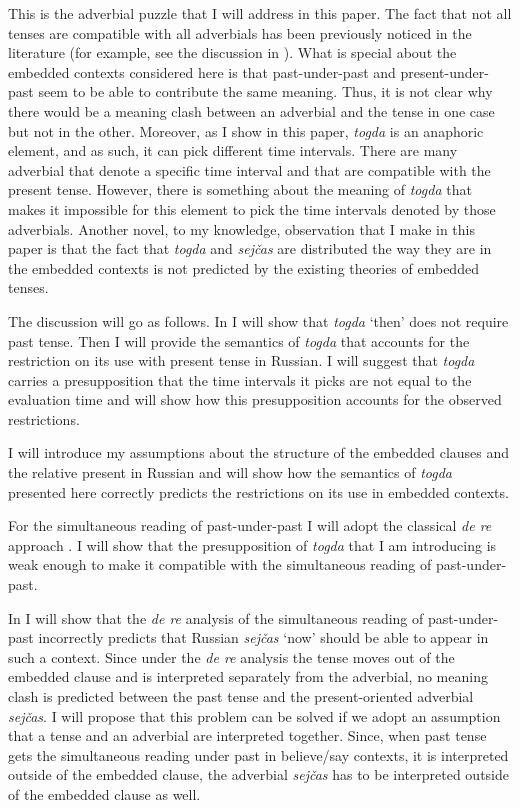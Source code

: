 \documentclass[output=paper,
modfonts,
newtxmath,
hidelinks
]{langscibook}
\begin{document}
\noindent This is the adverbial puzzle that I will address in this paper. The fact that not all tenses are compatible with all adverbials has been previously noticed in the literature (for example, see the discussion in \citealt{Hornstein1990}). What is special about the embedded contexts considered here is that past-under-past and present-under-past seem to be able to contribute the same meaning. Thus, it is not clear why there would be a meaning clash between an adverbial and the tense in one case but not in the other. Moreover, as I show in this paper, \textit{togda} is an anaphoric element, and as such, it can pick different time intervals. There are many adverbial that denote a specific time interval and that are compatible with the present tense. However, there is something about the meaning of \textit{togda} that makes it impossible for this element to pick the time intervals denoted by those adverbials. Another novel, to my knowledge, observation that I make in this paper is that the fact that \textit{togda} and \textit{sejčas} are distributed the way they are in the embedded contexts is not predicted by the existing theories of embedded tenses.

The discussion will go as follows. In  I will show that \textit{togda} ‘then’ does not require past tense. Then I will provide the semantics of \textit{togda} that accounts for the restriction on its use with present tense in Russian. I will suggest that \textit{togda} carries a presupposition that the time intervals it picks are not equal to the evaluation time and will show how this presupposition accounts for the observed restrictions.

I will introduce my assumptions about the structure of the embedded clauses and the relative present in Russian and will show how the semantics of \textit{togda} presented here correctly predicts the restrictions on its use in embedded contexts.

For the simultaneous reading of past-under-past I will adopt the classical \textit{de re} approach \citep{Abusch1997,Heim1994}. I will show that the presupposition of \textit{togda} that I am introducing is weak enough to make it compatible with the simultaneous reading of past-under-past.

In  I will show that the \textit{de re} analysis of the simultaneous reading of past-under-past incorrectly predicts that Russian \textit{sejčas} ‘now’ should be able to appear in such a context. Since under the \textit{de re} analysis the tense moves out of the embedded clause and is interpreted separately from the adverbial, no meaning clash is predicted between the past tense and the present-oriented adverbial \textit{sejčas}. I will propose that this problem can be solved if we adopt an assumption that a tense and an adverbial are interpreted together. Since, when past tense gets the simultaneous reading under past in believe/say contexts, it is interpreted outside of the embedded clause, the adverbial \textit{sejčas} has to be interpreted outside of the embedded clause as well.
\end{document}
